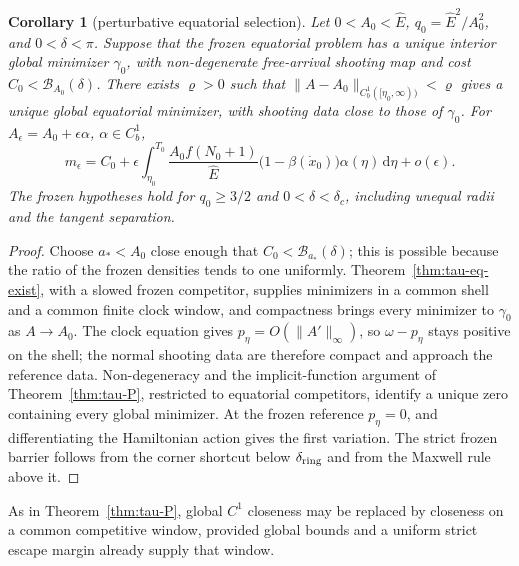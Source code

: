 \documentclass[aip,jmp,amsmath,amssymb,reprint]{revtex4-2}
\newcommand{\Ehat}{\hat E}
\newcommand{\dd}{\mathrm{d}}
\theoremstyle{plain}
\newtheorem{corollary}[proposition]{Corollary}
\theoremstyle{definition}
\begin{document}
\begin{corollary}[perturbative equatorial selection]\label{cor:tau-eq-P}
Let $0<A_0<\Ehat$, $q_0=\Ehat^2/A_0^2$, and $0<\delta<\pi$. Suppose that the frozen equatorial problem has a unique interior
global minimizer $\gamma_0$, with non-degenerate free-arrival shooting map and cost
$C_0<\mathcal B_{A_0}(\delta)$. There exists $\varrho>0$ such that $\|A-A_0\|_{C^1_b([\eta_0,\infty))}<\varrho$ gives a
unique global equatorial minimizer, with shooting data close to those of $\gamma_0$. For
$A_\epsilon=A_0+\epsilon\alpha$, $\alpha\in C^1_b$,
\[
  m_\epsilon=C_0+\epsilon\int_{\eta_0}^{T_0}\frac{A_0f(N_0+1)}{\Ehat}\bigl(1-\beta(\dot x_0)\bigr)\alpha(\eta)\,\dd\eta+o(\epsilon).
\]
The frozen hypotheses hold for $q_0\ge3/2$ and $0<\delta<\delta_c$, including unequal radii and the
tangent separation.
\end{corollary}

\begin{proof}
Choose $a_*<A_0$ close enough that $C_0<\mathcal B_{a_*}(\delta)$; this is possible because the ratio of
the frozen densities tends to one uniformly. Theorem~\ref{thm:tau-eq-exist}, with a slowed frozen
competitor, supplies minimizers in a common shell and a common finite clock window, and
compactness brings every minimizer to $\gamma_0$ as $A\to A_0$. The clock equation gives
$p_\eta=O(\|A'\|_\infty)$, so $\omega-p_\eta$ stays positive on the shell; the normal shooting data are therefore
compact and approach the reference data. Non-degeneracy and the implicit-function argument of
Theorem~\ref{thm:tau-P}, restricted to equatorial competitors, identify a unique zero containing
every global minimizer. At the frozen reference $p_\eta=0$, and differentiating the Hamiltonian action
gives the first variation. The strict frozen barrier follows from the corner shortcut below
$\delta_{\rm ring}$ and from the Maxwell rule above it.
\end{proof}

As in Theorem~\ref{thm:tau-P}, global $C^1$ closeness may be replaced by closeness on a common
competitive window, provided global bounds and a uniform strict escape margin already supply that
window.
\end{document}
